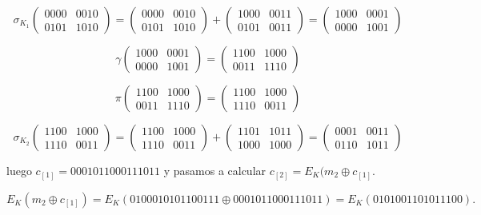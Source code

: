 \documentclass[a4paper]{article}
\begin{document}
$$\sigma_{K_1} \begin{pmatrix} 0000 & 0010 \\ 0101 & 1010 \end{pmatrix} = \begin{pmatrix} 0000 & 0010 \\ 0101 & 1010 \end{pmatrix} + \begin{pmatrix} 1000 & 0011 \\ 0101 & 0011 \end{pmatrix} = \begin{pmatrix} 1000 & 0001 \\ 0000 & 1001 \end{pmatrix}$$

$$\gamma \begin{pmatrix} 1000 & 0001 \\ 0000 & 1001 \end{pmatrix} = \begin{pmatrix} 1100 & 1000 \\ 0011 & 1110 \end{pmatrix}$$

$$\pi \begin{pmatrix} 1100 & 1000 \\ 0011 & 1110 \end{pmatrix} = \begin{pmatrix} 1100 & 1000 \\ 1110 & 0011 \end{pmatrix}$$

$$\sigma_{K_2} \begin{pmatrix} 1100 & 1000 \\ 1110 & 0011 \end{pmatrix} = \begin{pmatrix} 1100 & 1000 \\ 1110 & 0011 \end{pmatrix} + \begin{pmatrix} 1101 & 1011 \\ 1000 & 1000 \end{pmatrix} = \begin{pmatrix} 0001 & 0011 \\ 0110 & 1011 \end{pmatrix}$$

luego $c_{[1]} = 0001 0110 0011 1011$ y pasamos a calcular $c_{[2]} = E_K(m_2 \oplus c_{[1]}$.

$$E_K(m_2 \oplus c_{[1]}) = E_K( 0100 0101 0110 0111 \oplus 0001 0110 0011 1011) = E_K(0101 0011 0101 1100).$$
\end{document}

